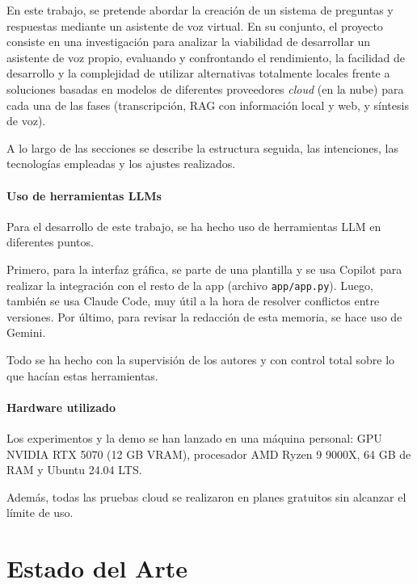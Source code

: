 \documentclass[11pt,spanish,listoffigures,listoftables]{tfgetsinf}
\begin{document}
En este trabajo, se pretende abordar la creación de un sistema de preguntas y respuestas mediante un asistente de voz virtual. En su conjunto, el proyecto consiste en una investigación para analizar la viabilidad de desarrollar un asistente de voz propio, evaluando y confrontando el rendimiento, la facilidad de desarrollo y la complejidad de utilizar alternativas totalmente locales frente a soluciones basadas en modelos de diferentes proveedores \textit{cloud} (en la nube) para cada una de las fases (transcripción, RAG con información local y web, y síntesis de voz).

A lo largo de las secciones se describe la estructura seguida, las intenciones, las tecnologías empleadas y los ajustes realizados.

\subsubsection{Uso de herramientas LLMs}
Para el desarrollo de este trabajo, se ha hecho uso de herramientas LLM en diferentes puntos. 

\noindent Primero, para la interfaz gráfica, se parte de una plantilla y se usa Copilot para realizar la integración con el resto de la app (archivo \texttt{app/app.py}). Luego, también se usa Claude Code, muy útil a la hora de resolver conflictos entre versiones. Por último, para revisar la redacción de esta memoria, se hace uso de Gemini.

Todo se ha hecho con la supervisión de los autores y con control total sobre lo que hacían estas herramientas.

\subsubsection{Hardware utilizado}
Los experimentos y la demo se han lanzado en una máquina personal: GPU NVIDIA RTX 5070 (12 GB VRAM), procesador AMD Ryzen 9 9000X, 64 GB de RAM y Ubuntu 24.04 LTS.

Además, todas las pruebas cloud se realizaron en planes gratuitos sin alcanzar el límite de uso.

\chapter{Estado del Arte}
\end{document}
